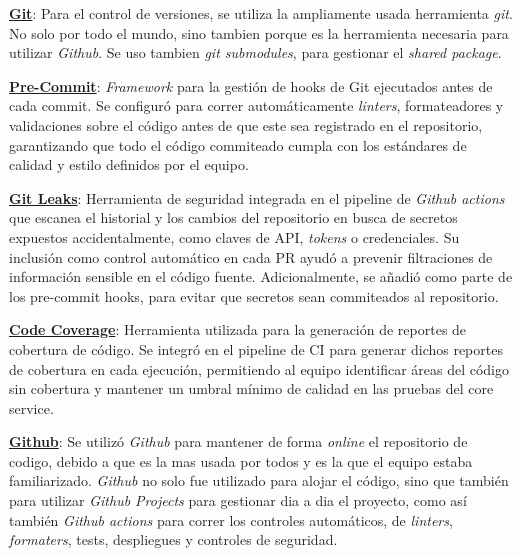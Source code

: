 \vspace{0.25cm}

\textbf{\underline{Git}}: Para el control de versiones, se utiliza la ampliamente usada herramienta \textit{git}. No solo por 
todo el mundo, sino tambien porque es la herramienta necesaria para utilizar \textit{Github}. Se uso tambien \textit{git
submodules}, para gestionar el \textit{shared package}.

\vspace{0.25cm}

\textbf{\underline{Pre-Commit}}: \textit{Framework} para la gestión de hooks de Git ejecutados antes de cada commit. Se 
configuró para correr automáticamente \textit{linters}, formateadores y validaciones sobre el código antes de que este sea 
registrado en el repositorio, garantizando que todo el código commiteado cumpla con los estándares de calidad y estilo definidos 
por el equipo.

\vspace{0.25cm}

\textbf{\underline{Git Leaks}}: Herramienta de seguridad integrada en el pipeline de \textit{Github actions} que escanea 
el historial y los cambios del repositorio en busca de secretos expuestos accidentalmente, como claves de API, \textit{tokens} o 
credenciales. Su inclusión como control automático en cada PR ayudó a prevenir filtraciones de información sensible en el código fuente.
Adicionalmente, se añadió como parte de los pre-commit hooks, para evitar que secretos sean commiteados al repositorio.

\vspace{0.25cm}

\textbf{\underline{Code Coverage}}: Herramienta utilizada para la generación de reportes de cobertura de código. 
Se integró en el pipeline de CI para generar dichos reportes de cobertura en cada ejecución, permitiendo al equipo identificar 
áreas del código sin cobertura y mantener un umbral mínimo de calidad en las pruebas del core service.

\vspace{0.25cm}

\textbf{\underline{Github}}: Se utilizó \textit{Github} para mantener de forma \textit{online} el repositorio de codigo,
debido a que es la mas usada por todos y es la que el equipo estaba familiarizado. \textit{Github} no solo fue utilizado para 
alojar el código, sino que también para utilizar \textit{Github Projects} para gestionar dia a dia el proyecto, como así 
también \textit{Github actions} para correr los controles automáticos, de \textit{linters}, \textit{formaters}, tests, 
despliegues y controles de seguridad.

